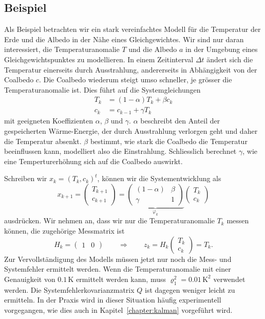 \subsection{Beispiel}
Als Beispiel betrachten wir ein stark vereinfachtes Modell für die
Temperatur der Erde und die Albedo in der Nähe eines Gleichgewichtes.
Wir sind nur daran interessiert, die Temperaturanomalie $T$ und die
Albedo $a$ in der Umgebung eines Gleichgewichtspunktes zu
modellieren.
In einem Zeitinterval $\Delta t$ ändert sich die Temperatur
einerseits durch Ausstrahlung, andererseits in Abhängigkeit von
der Coalbedo $c$. 
Die Coalbedo wiederum steigt umso schneller, je grösser die
Temperaturanomalie ist.
Dies führt auf die Systemgleichungen
\[
\begin{aligned}
T_k &= (1-\alpha) T_k  + \beta c_k \\
c_k &= c_{k-1} + \gamma T_k
\end{aligned}
\]
mit geeigneten Koeffizienten $\alpha$, $\beta$ und $\gamma$.
$\alpha$ beschreibt den Anteil der gespeicherten Wärme-Energie, der durch
Ausstrahlung verlorgen geht und daher die Temperatur absenkt.
$\beta$ bestimmt, wie stark die Coalbedo die Temperatur beeinflussen kann,
modelliert also die Einstrahlung.
Schliesslich berechnet $\gamma$, wie eine Temperturerhöhung sich auf die
Coalbedo auswirkt.

Schreiben wir $x_k=(T_k,c_k)^t$, können wir die Systementwicklung als
\[
x_{k+1}
=
\begin{pmatrix}
T_{k+1}\\c_{k+1}
\end{pmatrix}
=
\underbrace{
\begin{pmatrix}
(1-\alpha)&\beta\\
\gamma& 1
\end{pmatrix}}_{\displaystyle\varphi_k}
\begin{pmatrix}
T_k\\c_k
\end{pmatrix}
\]
ausdrücken.
Wir nehmen an, dass wir nur die Temperaturanomalie $T_k$ messen können,
die zugehörige Messmatrix ist
\[
H_k=\begin{pmatrix}1&0\end{pmatrix}
\qquad\Rightarrow\qquad
z_k = H_k\begin{pmatrix} T_k\\c_k\end{pmatrix}
=
T_k.
\]
Zur Vervollständigung des Modells müssen jetzt nur noch die Mess- und
Systemfehler ermittelt werden.
Wenn die Temperaturanomalie mit einer Genauigkeit von $0.1\,\text{K}$
ermittelt werden kann, muss $\varrho_1^2=0.01\,\text{K}^2$ verwendet
werden.
Die Systemfehlerkovarianzmatrix $Q$ ist dagegen weniger leicht zu ermitteln.
In der Praxis wird in dieser Situation häufig experimentell vorgegangen,
wie dies auch in Kapitel~\ref{chapter:kalman} vorgeführt wird.






